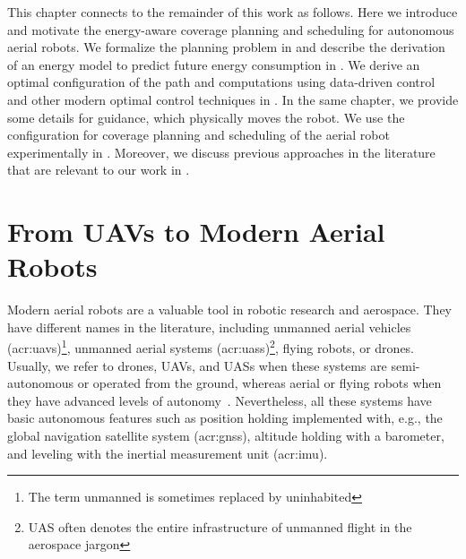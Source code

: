 This chapter connects to the remainder of this work as follows. Here we introduce and motivate the energy-aware coverage planning and scheduling for autonomous aerial robots. We formalize the planning problem in  and describe the derivation of an energy model to predict future energy consumption in . We derive an optimal configuration of the path and computations using data-driven control and other modern optimal control techniques in . In the same chapter, we provide some details for guidance, which physically moves the robot. We use the configuration for coverage planning and scheduling of the aerial robot experimentally in . Moreover, we discuss previous approaches in the literature that are relevant to our work in .


\section{From UAVs to Modern Aerial Robots}
\label{sec:history}

Modern aerial robots are a valuable tool in robotic research and aerospace. They have different names in the literature, including unmanned aerial vehicles (\Gls{acr:uav}s)\footnote{The term unmanned is sometimes replaced by uninhabited}, unmanned aerial systems (\Gls{acr:uas}s)\footnote{UAS often denotes the entire infrastructure of unmanned flight in the aerospace jargon}, flying robots, or drones. Usually, we refer to drones, UAVs, and UASs when these systems are semi-autonomous or operated from the ground, whereas aerial or flying robots when they have advanced levels of autonomy~\citep{siciliano2016springer}. Nevertheless, all these systems have basic autonomous features such as position holding implemented with, e.g., the global navigation satellite system (\Gls{acr:gnss}), altitude holding with a barometer, and leveling with the inertial measurement unit (\Gls{acr:imu}).

